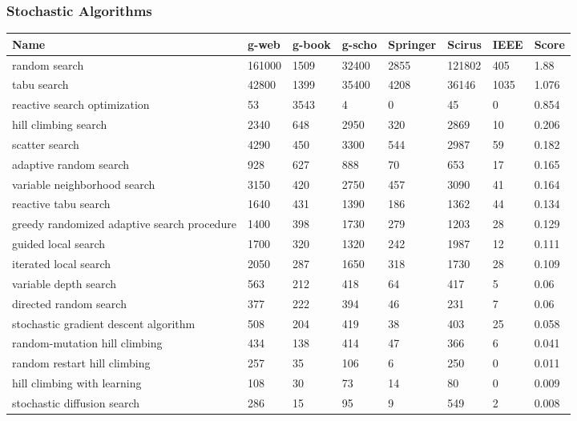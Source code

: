 \documentclass[a4paper, 11pt]{article}
\begin{document}
\subsubsection{Stochastic Algorithms}

\begin{table}[ht]
	\centering\footnotesize
		\begin{tabularx}{\textwidth}{Xlllllll}
		\toprule
		\textbf{Name} & \textbf{g-web} & \textbf{g-book} & \textbf{g-scho} & \textbf{Springer} & \textbf{Scirus} & \textbf{IEEE} & \textbf{Score} \\ 
		\toprule
		random search & 161000 & 1509 & 32400 & 2855 & 121802 & 405 & 1.88 \\
		tabu search & 42800 & 1399 & 35400 & 4208 & 36146 & 1035 & 1.076 \\
		reactive search optimization & 53 & 3543 & 4 & 0 & 45 & 0 & 0.854 \\
		hill climbing search & 2340 & 648 & 2950 & 320 & 2869 & 10 & 0.206 \\
		scatter search & 4290 & 450 & 3300 & 544 & 2987 & 59 & 0.182 \\
		adaptive random search & 928 & 627 & 888 & 70 & 653 & 17 & 0.165 \\
		variable neighborhood search & 3150 & 420 & 2750 & 457 & 3090 & 41 & 0.164 \\
		reactive tabu search & 1640 & 431 & 1390 & 186 & 1362 & 44 & 0.134 \\
		greedy randomized adaptive search procedure & 1400 & 398 & 1730 & 279 & 1203 & 28 & 0.129 \\
		guided local search & 1700 & 320 & 1320 & 242 & 1987 & 12 & 0.111 \\
		iterated local search & 2050 & 287 & 1650 & 318 & 1730 & 28 & 0.109 \\
		variable depth search & 563 & 212 & 418 & 64 & 417 & 5 & 0.06 \\
		directed random search & 377 & 222 & 394 & 46 & 231 & 7 & 0.06 \\
		stochastic gradient descent algorithm & 508 & 204 & 419 & 38 & 403 & 25 & 0.058 \\
		random-mutation hill climbing & 434 & 138 & 414 & 47 & 366 & 6 & 0.041 \\
		random restart hill climbing & 257 & 35 & 106 & 6 & 250 & 0 & 0.011 \\
		hill climbing with learning & 108 & 30 & 73 & 14 & 80 & 0 & 0.009 \\
		stochastic diffusion search & 286 & 15 & 95 & 9 & 549 & 2 & 0.008 \\

\end{tabularx}
\end{table}
\end{document}
